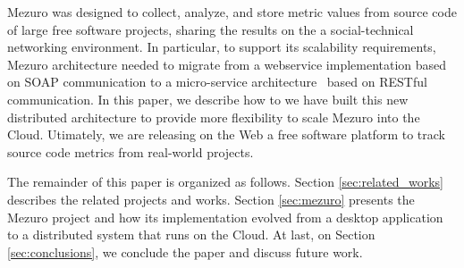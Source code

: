 Mezuro was designed to collect, analyze, and store metric values from source
code of large free software projects, sharing the results on
the a social-technical networking environment. In particular, to support its
scalability requirements, Mezuro architecture needed to migrate from a
webservice implementation based on SOAP communication to a micro-service
architecture~\cite{namiot2014micro} based on RESTful communication. In this
paper, we describe how to we have built this new distributed architecture to
provide more flexibility to scale Mezuro into the Cloud. Utimately, we are
releasing on the Web a free software platform to track source code metrics from
real-world projects.

The remainder of this paper is organized as follows. Section
\ref{sec:related_works} describes the related projects and works. Section
\ref{sec:mezuro} presents the Mezuro project and how its implementation evolved
from a desktop application to a distributed system that runs on the Cloud. At
last, on Section \ref{sec:conclusions}, we conclude the paper and discuss
future work.
